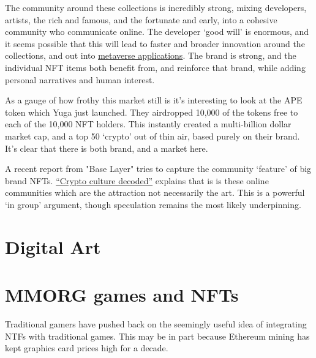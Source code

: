 The community around these collections is incredibly strong, mixing developers, artists, the rich and famous, and the fortunate and early, into a cohesive community who communicate online. The developer `good will' is enormous, and it seems possible that this will lead to faster and broader innovation around the collections, and out into \href{https://twitter.com/yugalabs/status/1505014986556551172?}{metaverse applications}. The brand is strong, and the individual NFT items both benefit from, and reinforce that brand, while adding personal narratives and human interest.\par 
As a gauge of how frothy this market still is it's interesting to look at the APE token which Yuga just launched. They airdropped 10,000 of the tokens free to each of the 10,000 NFT holders. This instantly created a multi-billion dollar market cap, and a top 50 `crypto' out of thin air, based purely on their brand. It's clear that there is both brand, and a market here.\par
A recent report from "Base Layer" tries to capture the community `feature' of big brand NFTs. \href{https://baselayer.so/crypto-culture-decoded}{``Crypto culture decoded''} explains that is is these online communities which are the attraction not necessarily the art. This is a powerful `in group' argument, though speculation remains the most likely underpinning.




\section{Digital Art}


\section{MMORG games and NFTs}
Traditional gamers have pushed back on the seemingly useful idea of integrating NTFs with traditional games. This may be in part because Ethereum mining has kept graphics card prices high for a decade.

